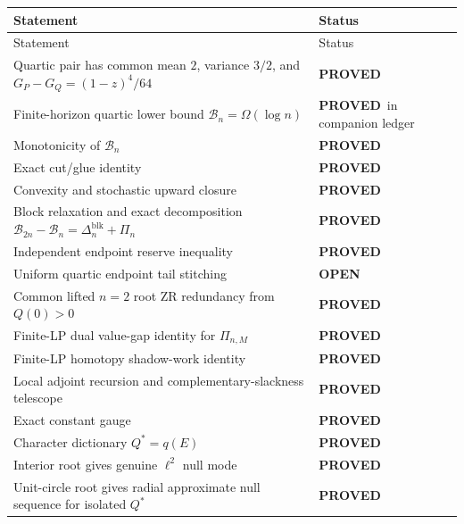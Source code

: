 \documentclass[11pt,a4paper]{article}
\newcommand{\Bcal}{\mathcal B}
\newcommand{\blk}{\mathrm{blk}}
\newcommand{\PROVED}{\textcolor{green!45!black}{\textbf{PROVED}}}
\newcommand{\OPEN}{\textcolor{red!70!black}{\textbf{OPEN}}}
\begin{document}
\begin{longtable}{p{}p{}}
\toprule
Statement & Status\\
\midrule
\endfirsthead
\toprule
Statement & Status\\
\midrule
\endhead

Quartic pair has common mean \(2\), variance \(3/2\), and
\(G_P-G_Q=(1-z)^4/64\)
& \PROVED\\

Finite-horizon quartic lower bound \(\Bcal_n=\Omega(\log n)\)
& \PROVED\ in companion ledger\\

Monotonicity of \(\Bcal_n\)
& \PROVED\\

Exact cut/glue identity
& \PROVED\\

Convexity and stochastic upward closure
& \PROVED\\

Block relaxation and exact decomposition
\(\Bcal_{2n}-\Bcal_n=\Delta_n^{\blk}+\Pi_n\)
& \PROVED\\

Independent endpoint reserve inequality
& \PROVED\\

Uniform quartic endpoint tail stitching
& \OPEN\\

Common lifted \(n=2\) root ZR redundancy from \(Q(0)>0\)
& \PROVED\\

Finite-LP dual value-gap identity for \(\Pi_{n,M}\)
& \PROVED\\

Finite-LP homotopy shadow-work identity
& \PROVED\\

Local adjoint recursion and complementary-slackness telescope
& \PROVED\\

Exact constant gauge
& \PROVED\\

Character dictionary \(Q^*=q(E)\)
& \PROVED\\

Interior root gives genuine \(\ell^2\) null mode
& \PROVED\\

Unit-circle root gives radial approximate null sequence for isolated \(Q^*\)
& \PROVED\\


\end{longtable}
\end{document}
